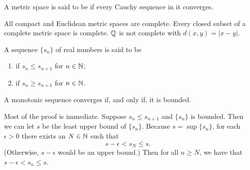 \documentclass{article}
\begin{document}
\begin{definition}
    A metric space is said to be  if every Cauchy sequence in it converges.
\end{definition}
\begin{example}
    \listhack 
    \begin{enumerate}
        \ii All compact and Euclidean metric spaces are complete. 
        \ii Every closed subset of a complete metric space is complete.
        \ii $\mathbb Q$ is not complete with $d(x,y)=|x-y|$.
    \end{enumerate}
\end{example}
\begin{definition}
    A sequence $\{s_{n}\}$ of real numbers is said to be
    \begin{enumerate}
        \item {} if $s_{n}\leq s_{n+1}$ for $n\in\mathbb N$;
        \item {} if $s_{n}\geq s_{n+1}$ for $n\in\mathbb N$.
    \end{enumerate}
\end{definition}
\begin{theorem}
    A monotonic sequence converges if, and only if, it is bounded.
\end{theorem}
\begin{remark}
    Most of the proof is immediate. Suppose $s_{n}\leq s_{n+1}$ and $\{s_{n}\}$ is bounded. Then we can let $s$ be the least upper bound of $\{s_{n}\}$. Because $s=\sup\{s_{n}\}$, for each $\epsilon>0$ there exists an $N\in\mathbb N$ such that \[s-\epsilon<s_{N}\leq s.\](Otherwise, $s-\epsilon$ would be an upper bound.) Then for all $n\geq N$, we have that $s-\epsilon<s_{n}\leq s$.
\end{remark}
\end{document}
